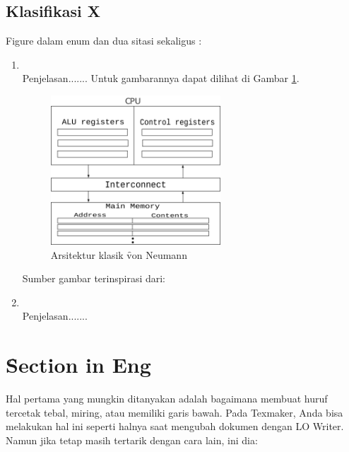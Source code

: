 \subsection{Klasifikasi X}
Figure dalam enum dan dua sitasi sekaligus \citep{book.buyya,book.sterling-jones} :  
\begin{enumerate}
\item {} \\
Penjelasan....... Untuk gambarannya dapat dilihat di Gambar \ref{fig:neumann}.

\begin{figure}
	\centering
	\includegraphics[height=0.65\textwidth,width=0.6\textwidth]
		{pics/neumann.pdf}
	\caption{Arsitektur klasik \f{von Neumann}}
	\label{fig:neumann}
\end{figure}
\vspace{-1.2cm}
\begin{center}
{\small Sumber gambar terinspirasi dari: \citep{buku.pressman}}
\end{center} 

\item {} \\
Penjelasan.......
\end{enumerate}
\paragraph{}
\section{\f{Section in Eng}}
Hal pertama yang mungkin ditanyakan adalah bagaimana membuat huruf tercetak tebal, miring, atau memiliki garis bawah. 
Pada Texmaker, Anda bisa melakukan hal ini seperti halnya saat mengubah dokumen dengan LO Writer. 
Namun jika tetap masih tertarik dengan cara lain, ini dia: 

